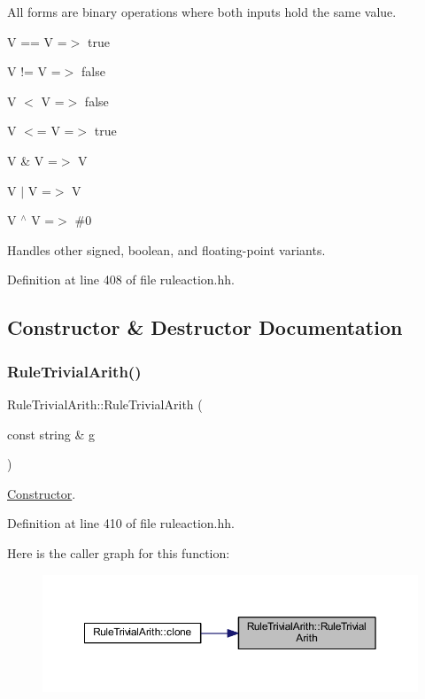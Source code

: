 All forms are binary operations where both inputs hold the same value.
\begin{DoxyItemize}
\item {\ttfamily V == V =$>$ true}
\item {\ttfamily V != V =$>$ false}
\item {\ttfamily V $<$ V =$>$ false}
\item {\ttfamily V $<$= V =$>$ true}
\item {\ttfamily V \& V =$>$ V}
\item {\ttfamily V $\vert$ V =$>$ V}
\item {\ttfamily V $^\wedge$ V =$>$ \#0}
\end{DoxyItemize}

Handles other signed, boolean, and floating-\/point variants. 

Definition at line 408 of file ruleaction.\+hh.



\subsection{Constructor \& Destructor Documentation}
\mbox{\label{class_rule_trivial_arith_a4dbc9fead8af1a3f3960d11c3f9c06df}} 
\subsubsection{\texorpdfstring{RuleTrivialArith()}{RuleTrivialArith()}}
{\footnotesize\ttfamily Rule\+Trivial\+Arith\+::\+Rule\+Trivial\+Arith (\begin{DoxyParamCaption}\item[{const string \&}]{g }\end{DoxyParamCaption})\hspace{0.3cm}{\ttfamily [inline]}}



\mbox{\hyperlink{class_constructor}{Constructor}}. 



Definition at line 410 of file ruleaction.\+hh.

Here is the caller graph for this function\+:
\nopagebreak
\begin{figure}[H]
\begin{center}
\leavevmode
\includegraphics[width=350pt]{class_rule_trivial_arith_a4dbc9fead8af1a3f3960d11c3f9c06df_icgraph}
\end{center}
\end{figure}


